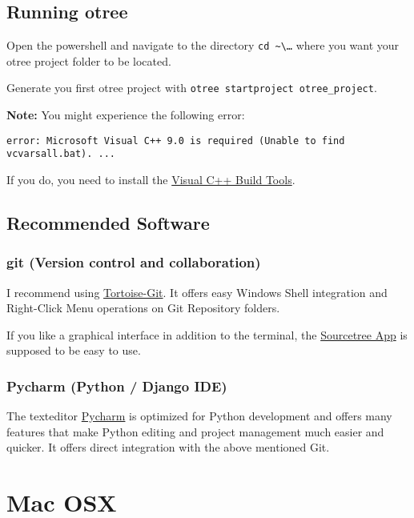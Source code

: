 \documentclass[11pt]{article}
\newcommand{\mscode}[1]{\colorbox{blue!40!black}{\footnotesize\color{white}\tt #1}}
\begin{document}
\subsection{Running otree}
\label{sec:orgheadline6}

Open the powershell and navigate to the directory \mscode{cd \textasciitilde\textbackslash\ldots} where you want your otree project folder to be located.

Generate you first otree project with \mscode{otree startproject otree\_project}.

\textbf{Note:} You might experience the following error:

\mscode{error: Microsoft Visual C++ 9.0 is required (Unable to find vcvarsall.bat). ...}

If you do, you need to install the \href{http://go.microsoft.com/fwlink/?LinkId=691126}{Visual C++ Build Tools}.


\subsection{Recommended Software}
\label{sec:orgheadline9}

\subsubsection{git (Version control and collaboration)}
\label{sec:orgheadline7}
I recommend using \href{https://tortoisegit.org/}{Tortoise-Git}. It offers easy Windows Shell integration and Right-Click Menu operations on Git Repository folders.

If you like a graphical interface in addition to the terminal, the \href{https://www.sourcetreeapp.com/}{Sourcetree App} is supposed to be easy to use.

\subsubsection{Pycharm (Python / Django IDE)}
\label{sec:orgheadline8}
The texteditor \href{http://www.jetbrains.com/pycharm/}{Pycharm} is optimized for Python development and offers many features that make Python editing and project management much easier and quicker. It offers direct integration with the above mentioned Git.


\newpage

\section{Mac OSX}
\label{sec:orgheadline20}
\end{document}
